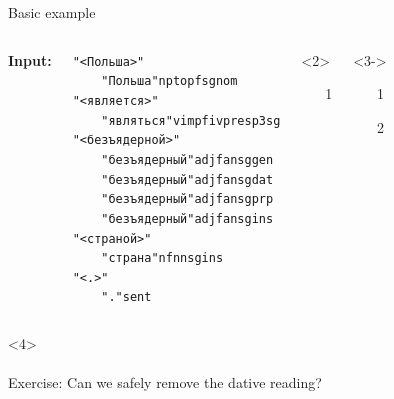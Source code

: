 \documentclass{beamer}
\begin{document}
\begin{frame}{Basic example}

\begin{columns}
   \textbf{Input:}
\begin{tiny}
\begin{alltt}
"<Польша>"\\
~~~~"Польша" np top f sg nom\\
"<является>"\\
~~~~"являться" v impf iv pres p3 sg\\
"<безъядерной>"\\
\alert<3-4>{~~~~"безъядерный" adj f an sg gen}\\
\alert<4>{~~~~"безъядерный" adj f an sg dat}\\
\alert<2-4>{~~~~"безъядерный" adj f an sg prp}\\
~~~~"безъядерный" adj f an sg ins\\
"<страной>"\\
~~~~"страна" n f nn sg ins\\
"<.>"\\
~~~~"." sent\\
\end{alltt}
\end{tiny}

\begin{onlyenv}<2>
\begin{itemize}
  \item[1]    
\end{itemize}
\end{onlyenv}
\begin{onlyenv}<3->
\begin{itemize}
  \item[1]    
  \item[2]    
\end{itemize}
\end{onlyenv}

\end{columns}

\begin{onlyenv}<4>
~\\
~\\
Exercise: Can we safely remove the dative reading?
\end{onlyenv}

\end{frame}
\end{document}
